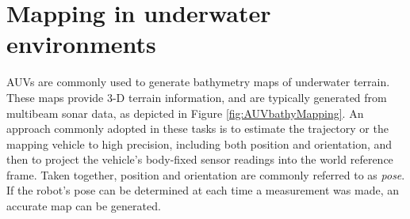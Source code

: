 %
%



\section{Mapping in underwater environments}

AUVs are commonly used to generate bathymetry maps of underwater terrain. These maps provide 3-D terrain information, and are typically generated from multibeam sonar data, as depicted in Figure \ref{fig:AUVbathyMapping}. An approach commonly adopted in these tasks is to estimate the trajectory or the mapping vehicle to high precision, including both position and orientation, and then to project the vehicle's body-fixed sensor readings into the world reference frame. Taken together, position and orientation are commonly referred to as \emph{pose}. If the robot's pose can be determined at each time a measurement was made, an accurate map can be generated. 


